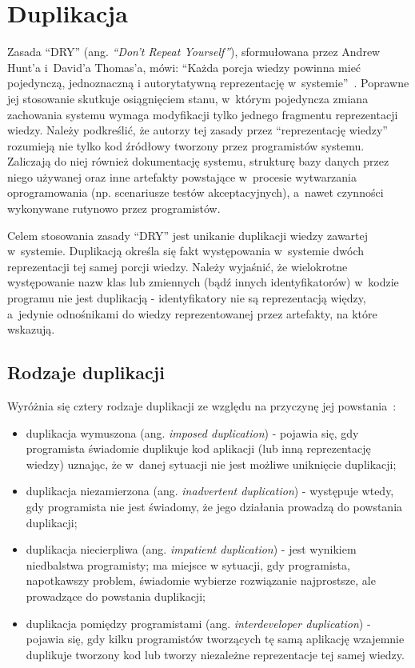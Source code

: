 \chapter{Duplikacja} \label{chap:duplication}

Zasada ``DRY'' (ang. \emph{``Don't Repeat Yourself''}), sformułowana przez Andrew Hunt'a i~David'a Thomas'a, mówi: ``Każda porcja wiedzy powinna mieć pojedynczą, jednoznaczną i autorytatywną reprezentację w~systemie''~\cite{prag_prog:dupl}.
Poprawne jej stosowanie skutkuje osiągnięciem stanu, w~którym pojedyncza zmiana zachowania systemu wymaga modyfikacji tylko jednego fragmentu reprezentacji wiedzy.
Należy podkreślić, że autorzy tej zasady przez ``reprezentację wiedzy'' rozumieją nie tylko kod źródłowy tworzony przez programistów systemu.
Zaliczają do niej również dokumentację systemu, strukturę bazy danych przez niego używanej oraz inne artefakty powstające w~procesie wytwarzania oprogramowania (np. scenariusze testów akceptacyjnych), a~nawet czynności wykonywane rutynowo przez programistów.

Celem stosowania zasady ``DRY'' jest unikanie duplikacji wiedzy zawartej w~systemie.
Duplikacją określa się fakt występowania w~systemie dwóch reprezentacji tej samej porcji wiedzy.
Należy wyjaśnić, że wielokrotne występowanie nazw klas lub zmiennych (bądź innych identyfikatorów) w~kodzie programu nie jest duplikacją - identyfikatory nie są reprezentacją więdzy, a~jedynie odnośnikami do wiedzy reprezentowanej przez artefakty, na które wskazują.



\section{Rodzaje duplikacji} \label{sec:dupl_kinds}

Wyróżnia się cztery rodzaje duplikacji ze względu na przyczynę jej powstania~\cite{prag_prog:dupl}:

\begin{itemize}
 \item duplikacja wymuszona (ang. \emph{imposed duplication}) - pojawia się, gdy programista świadomie duplikuje kod aplikacji (lub inną reprezentację wiedzy) uznając, że w~danej sytuacji nie jest możliwe uniknięcie duplikacji;
 \item duplikacja niezamierzona (ang. \emph{inadvertent duplication}) - występuje wtedy, gdy programista nie jest świadomy, że jego działania prowadzą do powstania duplikacji;
 \item duplikacja niecierpliwa (ang. \emph{impatient duplication}) - jest wynikiem niedbalstwa programisty; ma miejsce w sytuacji, gdy programista, napotkawszy problem, świadomie wybierze rozwiązanie najprostsze, ale prowadzące do powstania duplikacji;
 \item duplikacja pomiędzy programistami (ang. \emph{interdeveloper duplication}) - pojawia się, gdy kilku programistów tworzących tę samą aplikację wzajemnie duplikuje tworzony kod lub tworzy niezależne reprezentacje tej samej wiedzy.
\end{itemize}

